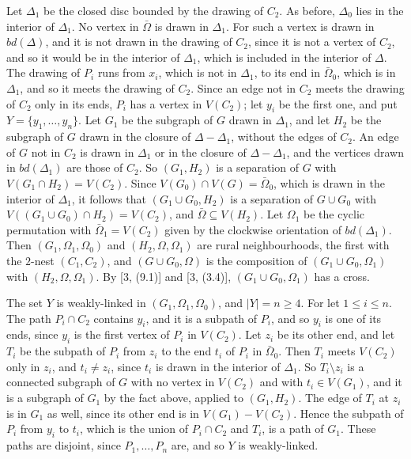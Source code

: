{Let $\Delta_1$ be the closed disc bounded by the drawing of $C_2$. As before, $\Delta_0$ lies in the interior of $\Delta_1$. No vertex in $\bar{\Omega}$ is drawn in $\Delta_1$. For such a vertex is drawn in $bd(\Delta)$, and it is not drawn in the drawing of $C_2$, since it is not a vertex of $C_2$, and so it would be in the interior of $\Delta_1$, which is included in the interior of $\Delta$. The drawing of $P_i$ runs from $x_i$, which is not in $\Delta_1$, to its end in $\bar{\Omega}_0$, which is in $\Delta_1$, and so it meets the drawing of $C_2$. Since an edge not in $C_2$ meets the drawing of $C_2$ only in its ends, $P_i$ has a vertex in $V(C_2)$; let $y_i$ be the first one, and put $Y = \{y_1, \dots, y_n\}$. Let $G_1$ be the subgraph of $G$ drawn in $\Delta_1$, and let $H_2$ be the subgraph of $G$ drawn in the closure of $\Delta - \Delta_1$, without the edges of $C_2$. An edge of $G$ not in $C_2$ is drawn in $\Delta_1$ or in the closure of $\Delta - \Delta_1$, and the vertices drawn in $bd(\Delta_1)$ are those of $C_2$. So $(G_1, H_2)$ is a separation of $G$ with $V(G_1 \cap H_2) = V(C_2)$. Since $V(G_0) \cap V(G) = \bar{\Omega}_0$, which is drawn in the interior of $\Delta_1$, it follows that $(G_1 \cup G_0, H_2)$ is a separation of $G \cup G_0$ with $V((G_1 \cup G_0) \cap H_2) = V(C_2)$, and $\bar{\Omega} \subseteq V(H_2)$. Let $\Omega_1$ be the cyclic permutation with $\bar{\Omega}_1 = V(C_2)$ given by the clockwise orientation of $bd(\Delta_1)$. Then $(G_1, \Omega_1, \Omega_0)$ and $(H_2, \Omega, \Omega_1)$ are rural neighbourhoods, the first with the $2$-nest $(C_1, C_2)$, and $(G \cup G_0, \Omega)$ is the composition of $(G_1 \cup G_0, \Omega_1)$ with $(H_2, \Omega, \Omega_1)$. By [3, (9.1)] and [3, (3.4)], $(G_1 \cup G_0, \Omega_1)$ has a cross.

The set $Y$ is weakly-linked in $(G_1, \Omega_1, \Omega_0)$, and $|Y| = n \ge 4$. For let $1 \le i \le n$. The path $P_i \cap C_2$ contains $y_i$, and it is a subpath of $P_i$, and so $y_i$ is one of its ends, since $y_i$ is the first vertex of $P_i$ in $V(C_2)$. Let $z_i$ be its other end, and let $T_i$ be the subpath of $P_i$ from $z_i$ to the end $t_i$ of $P_i$ in $\bar{\Omega}_0$. Then $T_i$ meets $V(C_2)$ only in $z_i$, and $t_i \ne z_i$, since $t_i$ is drawn in the interior of $\Delta_1$. So $T_i \setminus z_i$ is a connected subgraph of $G$ with no vertex in $V(C_2)$ and with $t_i \in V(G_1)$, and it is a subgraph of $G_1$ by the fact above, applied to $(G_1, H_2)$. The edge of $T_i$ at $z_i$ is in $G_1$ as well, since its other end is in $V(G_1) - V(C_2)$. Hence the subpath of $P_i$ from $y_i$ to $t_i$, which is the union of $P_i \cap C_2$ and $T_i$, is a path of $G_1$. These paths are disjoint, since $P_1, \dots, P_n$ are, and so $Y$ is weakly-linked.

}
